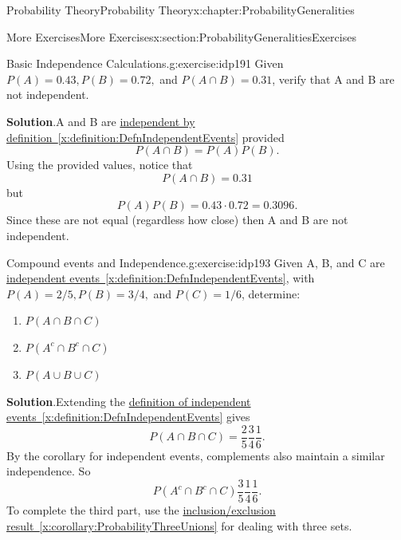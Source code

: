 \documentclass[oneside,10pt,]{book}
\newcommand{\blocktitlefont}{\relax}
\newcommand{\xreffont}{\relax}
\numberwithin{equation}{section}
\begin{document}
\begin{chapterptx}{Probability Theory}{}{Probability Theory}{}{}{x:chapter:ProbabilityGeneralities}
\begin{sectionptx}{More Exercises}{}{More Exercises}{}{}{x:section:ProbabilityGeneralitiesExercises}
\begin{inlineexercise}{Basic Independence Calculations.}{g:exercise:idp191}%
Given \(P(A) = 0.43, P(B) = 0.72, \) and \(P(A \cap B) = 0.31\), verify that A and B are not independent.%
\par\smallskip%
\noindent\textbf{\blocktitlefont Solution}.\hypertarget{g:solution:idp192}{}\quad{}A and B are \hyperref[x:definition:DefnIndependentEvents]{independent by definition~{\xreffont\ref{x:definition:DefnIndependentEvents}}} provided%
\begin{equation*}
P(A \cap B) = P(A) P(B).
\end{equation*}
Using the provided values, notice that%
\begin{equation*}
P(A \cap B) = 0.31
\end{equation*}
but%
\begin{equation*}
P(A)P(B) = 0.43 \cdot 0.72 = 0.3096.
\end{equation*}
Since these are not equal (regardless how close) then A and B are not independent.%
\end{inlineexercise}%
\begin{inlineexercise}{Compound events and Independence.}{g:exercise:idp193}%
Given A, B, and C are \hyperref[x:definition:DefnIndependentEvents]{independent events~{\xreffont\ref{x:definition:DefnIndependentEvents}}}, with \(P(A) = 2/5, P(B) = 3/4,\) and \(P(C) = 1/6\), determine:%
\begin{enumerate}
\item{}\(\displaystyle P(A \cap B \cap C)\)%
\item{}\(\displaystyle P(A^c \cap B^c \cap C)\)%
\item{}\(\displaystyle P(A \cup B \cup C)\)%
\end{enumerate}
%
\par\smallskip%
\noindent\textbf{\blocktitlefont Solution}.\hypertarget{g:solution:idp194}{}\quad{}Extending the \hyperref[x:definition:DefnIndependentEvents]{definition of independent events~{\xreffont\ref{x:definition:DefnIndependentEvents}}} gives%
\begin{equation*}
P(A \cap B \cap C) = \frac{2}{5} \frac{3}{4} \frac{1}{6}.
\end{equation*}
By the corollary for independent events, complements also maintain a similar independence. So%
\begin{equation*}
P(A^c \cap B^c \cap C) \frac{3}{5} \frac{1}{4} \frac{1}{6} .
\end{equation*}
To complete the third part, use the \hyperref[x:corollary:ProbabilityThreeUnions]{inclusion\slash{}exclusion result~{\xreffont\ref{x:corollary:ProbabilityThreeUnions}}} for dealing with three sets.%

\end{inlineexercise}
\end{sectionptx}
\end{chapterptx}
\end{document}
